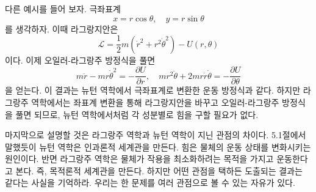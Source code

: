 \documentclass[chapter, oneside, b5paper]{oblivoir}
\theoremstyle{plain}
\theoremstyle{definition}
\theoremstyle{remark}
\begin{document}
다른 예시를 들어 보자. 극좌표계
\begin{equation*}
    x = r\cos{\theta}, \quad y = r\sin{\theta}
\end{equation*}
를 생각하자. 이때 라그랑지안은
\begin{equation}
    \mathcal{L} = \frac{1}{2}m(\dot{r}^2 + r^2\dot{\theta}^2) - U(r, \theta)
\end{equation}
이다. 이제 오일러-라그랑주 방정식을 풀면
\begin{equation}
    m\ddot{r} - mr\dot{\theta}^2 = -\frac{\partial U}{\partial r}, \quad mr^2\ddot{\theta} + 2mr\dot{r}\dot{\theta} = -\frac{\partial U}{\partial \theta}
\end{equation}
을 얻는다. 이 결과는 뉴턴 역학에서 극좌표계로 변환한 운동 방정식과 같다. 하지만 라그랑주 역학에서는 좌표계 변환을 통해 라그랑지안을 바꾸고 오일러-라그랑주 방정식을 풀면 되므로, 뉴턴 역학에서처럼 각 성분별로 힘을 구할 필요가 없다.

마지막으로 설명할 것은 라그랑주 역학과 뉴턴 역학이 지닌 관점의 차이다. 5.1절에서 말했듯이 뉴턴 역학은 인과론적 세계관을 만든다. 힘은 물체의 운동 상태를 변화시키는 원인이다. 반면 라그랑주 역학은 물체가 작용을 최소화하려는 목적을 가지고 운동한다고 본다. 즉, 목적론적 세계관을 만든다. 하지만 어떤 관점을 택하든 도출되는 결과는 같다는 사실을 기억하라. 우리는 한 문제를 여러 관점으로 볼 수 있는 자유가 있다.
\end{document}
